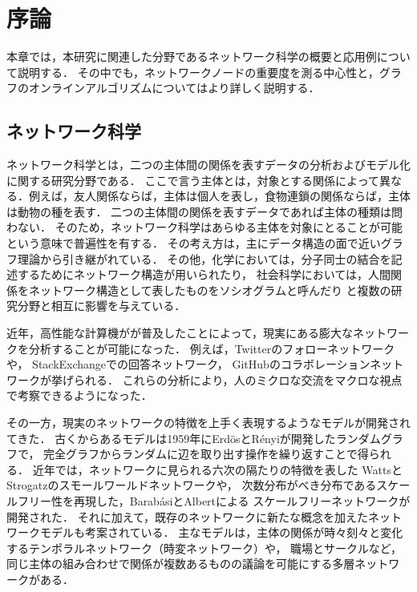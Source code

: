 \chapter{序論}
\label{chap:introduction}

本章では，本研究に関連した分野であるネットワーク科学の概要と応用例について説明する．
その中でも，ネットワークノードの重要度を測る中心性と，グラフのオンラインアルゴリズムについてはより詳しく説明する．

\section{ネットワーク科学}
\label{sect:network-science}

ネットワーク科学とは，二つの主体間の関係を表すデータの分析およびモデル化に関する研究分野である．
ここで言う主体とは，対象とする関係によって異なる．例えば，友人関係ならば，主体は個人を表し，食物連鎖の関係ならば，主体は動物の種を表す．
二つの主体間の関係を表すデータであれば主体の種類は問わない．
そのため，ネットワーク科学はあらゆる主体を対象にとることが可能という意味で普遍性を有する．
その考え方は，主にデータ構造の面で近いグラフ理論から引き継がれている．
その他，化学においては，分子同士の結合を記述するためにネットワーク構造が用いられたり\cite{Sylvester1878}，
社会科学においては，人間関係をネットワーク構造として表したものをソシオグラムと呼んだり\cite{Moreno1978}
と複数の研究分野と相互に影響を与えている．

近年，高性能な計算機がが普及したことによって，現実にある膨大なネットワークを分析することが可能になった．
例えば，Twitterのフォローネットワーク\cite{Kwak2010}や，
StackExchangeでの回答ネットワーク\cite{Movshovitz-Attias2013}，
GitHubのコラボレーションネットワーク\cite{Lima2014}が挙げられる．
これらの分析により，人のミクロな交流をマクロな視点で考察できるようになった．

その一方，現実のネットワークの特徴を上手く表現するようなモデルが開発されてきた．
古くからあるモデルは1959年にErd{\"{o}}sとR{\'{e}}nyiが開発したランダムグラフで，
完全グラフからランダムに辺を取り出す操作を繰り返すことで得られる．
近年では，ネットワークに見られる六次の隔たり\cite{Travers1969}の特徴を表した
WattsとStrogatzのスモールワールドネットワーク\cite{Watts1998}や，
次数分布がべき分布であるスケールフリー性を再現した，Barab{\'{a}}siとAlbertによる
スケールフリーネットワーク\cite{Barabasi1999}が開発された．
それに加えて，既存のネットワークに新たな概念を加えたネットワークモデルも考案されている．
主なモデルは，主体の関係が時々刻々と変化するテンポラルネットワーク（時変ネットワーク）\cite{Holme2012}や，
職場とサークルなど，同じ主体の組み合わせで関係が複数あるものの議論を可能にする多層ネットワーク\cite{Kivela2014}がある．

